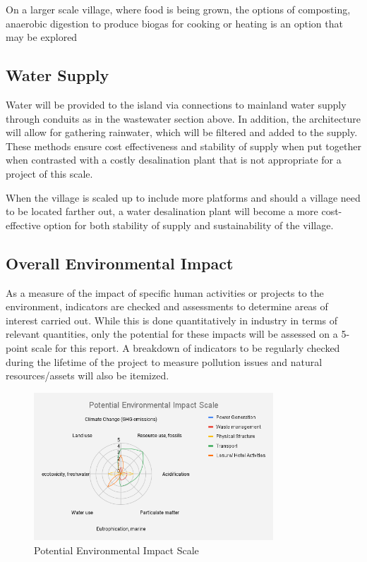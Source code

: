 \documentclass[11pt]{article}
\numberwithin{equation}{section}
\begin{document}
On a larger scale village, where food is being grown, the options of composting, anaerobic digestion to produce biogas for cooking or heating is an option that may be explored

\subsection{Water Supply}
\label{sec:org4f07e64}
Water will be provided to the island via connections to mainland water supply through conduits as in the wastewater section above. In addition, the architecture will allow for gathering rainwater, which will be filtered and added to the supply. These methods ensure cost effectiveness and stability of supply when put together when contrasted with a costly desalination plant that is not appropriate for a project of this scale.

When the village is scaled up to include more platforms and should a village need to be located farther out, a water desalination plant will become a more cost-effective option for both stability of supply and sustainability of the village.

\subsection{Overall Environmental Impact}
\label{sec:orgba66fb7}
As a measure of the impact of specific human activities or projects to the environment, indicators are checked and assessments to determine areas of interest carried out. While this is done quantitatively in industry in terms of relevant quantities, only the potential for these impacts will be assessed on a 5-point scale for this report. A breakdown of indicators to be regularly checked during the lifetime of the project to measure pollution issues and natural resources/assets will also be itemized.

\begin{figure}[H]
\centering
\includegraphics[width=0.8\textwidth]{Figures/PotentialEnvironmentalImpactScale.png}
\caption{\label{PotentialEnvironmentalImpactScale}Potential Environmental Impact Scale}
\end{figure}
\end{document}
